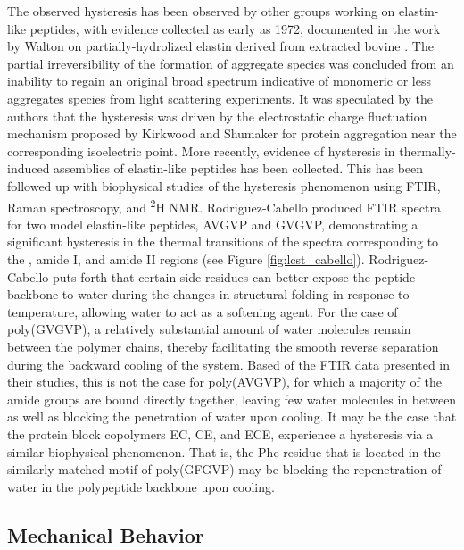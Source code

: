 \begin{refsection}
The observed hysteresis has been observed by other groups working on
elastin-like peptides, with evidence collected as early as 1972, documented in
the work by Walton on partially-hydrolized elastin derived from extracted bovine
.\cite{Jamieson1972a} The partial irreversibility of
the formation of aggregate species was concluded from an inability to regain an
original broad spectrum indicative of monomeric or less aggregates species from
light scattering experiments. It was speculated by the authors that the
hysteresis was driven by the electrostatic charge fluctuation mechanism proposed
by Kirkwood and Shumaker\cite{Kirkwood1952} for protein aggregation near the
corresponding isoelectric point. More recently, evidence of hysteresis in
thermally-induced assemblies of elastin-like peptides has been
collected.\cite{Osborne2008,Herrero-Vanrell2005} This has been followed up with
biophysical studies of the hysteresis phenomenon using FTIR, Raman spectroscopy,
and \textsuperscript{2}H NMR.\cite{Schmidt2005,Ma2012b} Rodriguez-Cabello
produced FTIR spectra for two model elastin-like peptides, AVGVP and GVGVP,
demonstrating a significant hysteresis in the thermal transitions of the spectra
corresponding to the , amide I, and amide II regions (see Figure
\ref{fig:lcst_cabello}).  Rodriguez-Cabello puts forth that certain side residues
can better expose the peptide backbone to water during the changes in structural
folding in response to temperature, allowing water to act as a softening agent.
For the case of poly(GVGVP), a relatively substantial amount of water molecules
remain between the polymer chains, thereby facilitating the smooth reverse
separation during the backward cooling of the system. Based of the FTIR data
presented in their studies, this is not the case for poly(AVGVP), for which a
majority of the amide groups are bound directly together, leaving few water
molecules in between as well as blocking the penetration of water upon cooling.
It may be the case that the protein block copolymers EC, CE, and ECE, experience
a hysteresis via a similar biophysical phenomenon. That is, the Phe residue that
is located in the similarly matched motif of poly(GFGVP) may be blocking the
repenetration of water in the polypeptide backbone upon cooling. 

\subsection{Mechanical Behavior}


\end{refsection}
